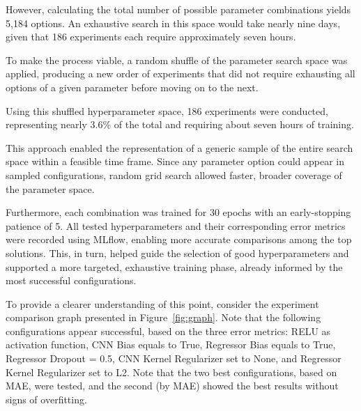 \documentclass[10pt,conference]{IEEEtran}
\begin{document}
However, calculating the total number of possible parameter combinations yields 5,184 options. An exhaustive search in this space would take nearly nine days, given that 186 experiments each require approximately seven hours.

To make the process viable, a random shuffle of the parameter search space was applied, producing a new order of experiments that did not require exhausting all options of a given parameter before moving on to the next.

Using this shuffled hyperparameter space, 186 experiments were conducted, representing nearly 3.6\% of the total and requiring about seven hours of training.

This approach enabled the representation of a generic sample of the entire search space within a feasible time frame. Since any parameter option could appear in sampled configurations, random grid search allowed faster, broader coverage of the parameter space.

Furthermore, each combination was trained for 30 epochs with an early-stopping patience of 5. All tested hyperparameters and their corresponding error metrics were recorded using MLflow, enabling more accurate comparisons among the top solutions. This, in turn, helped guide the selection of good hyperparameters and supported a more targeted, exhaustive training phase, already informed by the most successful configurations.

To provide a clearer understanding of this point, consider the experiment comparison graph presented in Figure~\ref{fig:graph}. Note that the following configurations appear successful, based on the three error metrics: RELU as activation function, CNN Bias equals to True, Regressor Bias equals to True, Regressor Dropout = 0.5, CNN Kernel Regularizer set to None, and Regressor Kernel Regularizer set to L2. Note that the two best configurations, based on MAE, were tested, and the second (by MAE) showed the best results without signs of overfitting.

\end{document}
